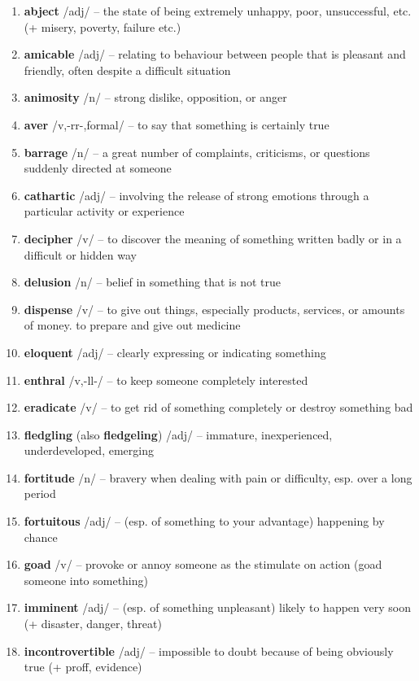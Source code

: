 \begin{enumerate}[wide,labelindent=0pt]
\item \textbf{abject} /adj/ -- the state of being extremely unhappy, poor, unsuccessful, etc. (+ misery, poverty, failure etc.)
\item \textbf{amicable} /adj/ -- relating to behaviour between people that is pleasant and friendly, often despite a difficult situation
\item \textbf{animosity} /n/ -- strong dislike, opposition, or anger
\item \textbf{aver} /v,-rr-,formal/ -- to say that something is certainly true
\item \textbf{barrage} /n/ -- a great number of complaints, criticisms, or questions suddenly directed at someone
\item \textbf{cathartic} /adj/ -- involving the release of strong emotions through a particular activity or experience
\item \textbf{decipher} /v/ -- to discover the meaning of something written badly or in a difficult or hidden way
\item \textbf{delusion} /n/ -- belief in something that is not true
\item \textbf{dispense} /v/ --  to give out things, especially products, services, or amounts of money.  to prepare and give out medicine
\item \textbf{eloquent} /adj/ -- clearly expressing or indicating something
\item \textbf{enthral} /v,-ll-/ -- to keep someone completely interested
\item \textbf{eradicate} /v/ -- to get rid of something completely or destroy something bad
\item \textbf{fledgling} (also \textbf{fledgeling}) /adj/ -- immature, inexperienced, underdeveloped, emerging
\item \textbf{fortitude} /n/ -- bravery when dealing with pain or difficulty, esp. over a long period
\item \textbf{fortuitous} /adj/ -- (esp. of something to your advantage) happening by chance
\item \textbf{goad} /v/ -- provoke or annoy someone as the stimulate on action (goad someone into something)
\item \textbf{imminent} /adj/ -- (esp. of something unpleasant) likely to happen very soon (+ disaster, danger, threat)
\item \textbf{incontrovertible} /adj/ -- impossible to doubt because of being obviously true (+ proff, evidence)

\end{enumerate}
